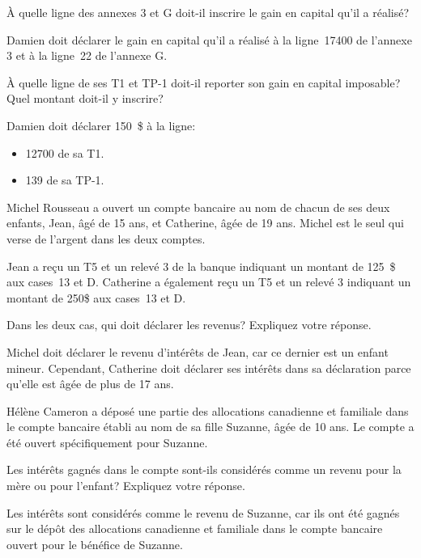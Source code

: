 \setcounter{sousQuestion}{0}
\begin{sousQuestion}
	À quelle ligne des annexes 3 et G doit-il inscrire le gain en capital qu'il a réalisé? 
\end{sousQuestion}
Damien doit déclarer le gain en capital qu'il a réalisé à la ligne~17400 de l'annexe 3 et à la ligne~22 de l'annexe G.

\begin{sousQuestion}
	À quelle ligne de ses T1 et TP-1 doit-il reporter son gain en capital imposable? Quel montant doit-il y inscrire? 
\end{sousQuestion}
Damien doit déclarer 150~\$ à la ligne:
\begin{itemize}
	\item 12700 de sa T1.
	\item 139 de sa TP-1.
\end{itemize}

\begin{question}
	Michel Rousseau a ouvert un compte bancaire au nom de chacun de ses deux enfants, Jean, âgé de 15 ans, et Catherine, âgée de 19 ans. Michel est le seul qui verse de l'argent dans les deux comptes.
	
	Jean a reçu un T5 et un relevé 3 de la banque indiquant un montant de 125~\$ aux cases~13 et D. Catherine a également reçu un T5 et un relevé 3  indiquant un montant de 250\$ aux cases~13 et D.
	
	Dans les deux cas, qui doit déclarer les revenus? Expliquez votre réponse.
\end{question}
Michel doit déclarer le revenu d'intérêts de Jean, car ce dernier est un enfant mineur. Cependant, Catherine doit déclarer ses intérêts dans sa déclaration parce qu'elle est âgée de plus de 17 ans.

\begin{question}
	Hélène Cameron a déposé une partie des allocations canadienne et familiale dans le compte bancaire établi au nom de sa fille Suzanne, âgée de 10 ans. Le compte a été ouvert spécifiquement pour Suzanne.
	
	Les intérêts gagnés dans le compte sont-ils considérés comme un revenu pour la mère ou pour l'enfant? Expliquez votre réponse.
\end{question}
Les intérêts sont considérés comme le revenu de Suzanne, car ils ont été gagnés sur le dépôt des allocations canadienne et familiale dans le compte bancaire ouvert pour le bénéfice de Suzanne.

